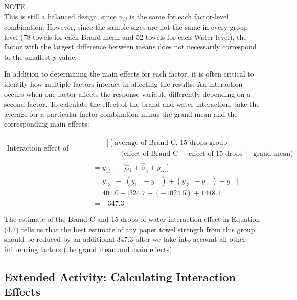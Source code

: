 \documentclass[
]{report}
\theoremstyle{definition}
\theoremstyle{definition}
\theoremstyle{definition}
\theoremstyle{definition}
\theoremstyle{remark}
\begin{document}
NOTE\\
This is still a balanced design, since \(n_{ij}\) is the same for each factor-level combination. However, since the sample sizes are not the same in every group level (78 towels for each Brand mean and 52 towels for each Water level), the factor with the largest difference between means does not necessarily correspond to the smallest \emph{p}-value.

In addition to determining the main effects for each factor, it is often critical to identify how multiple factors interact in affecting the results. An interaction occurs when one factor affects the response variable differently depending on a second factor. To calculate the effect of the brand and water interaction, take the average for a particular factor combination minus the grand mean and the corresponding main effects:

\begin{align}
\text{Interaction effect of Brand C and 15 drops of water}
  &= 
    \begin{aligned}[]
      \text{average of Brand C, 15 drops group}\\
      \quad
      -\bigl(\text{effect of Brand C}
             +\;\text{effect of 15 drops}
             +\;\text{grand mean}\bigr)
    \end{aligned}
    \nonumber
\\[6pt]
&= \bar y_{13\cdot} - \bigl[\hat\alpha_1 + \hat\beta_3 + \bar y_{\cdot\cdot\cdot}\bigr]
    \nonumber
\\[6pt]
&= \bar y_{13\cdot}
  - \bigl[(\bar y_{1\cdot\cdot}-\bar y_{\cdot\cdot\cdot})
         +(\bar y_{\cdot3\cdot}-\bar y_{\cdot\cdot\cdot})
         +\bar y_{\cdot\cdot\cdot}\bigr]
    \nonumber
\\[6pt]
&= 401.0 - \bigl[324.7 + (-1024.5) + 1448.1\bigr]
    \nonumber
\\[6pt]
&= -347.3
\tag{4.7}
\end{align}

The estimate of the Brand C and 15 drops of water interaction effect in Equation (4.7) tells us that the best
estimate of any paper towel strength from this group should be reduced by an additional 347.3 after we take
into account all other influencing factors (the grand mean and main effects).

\hypertarget{extended-activity-calculating-interaction-effects}{%
\subsection{Extended Activity: Calculating Interaction Effects}\label{extended-activity-calculating-interaction-effects}}
\end{document}
